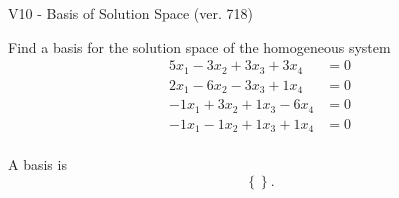 \begin{exercise}
  \begin{exerciseTitle}V10 - Basis of Solution Space (ver. 718)\end{exerciseTitle}
  \begin{exerciseStatement}
    Find a basis for the solution space of the homogeneous system 
\begin{align*}
 5 x_ 1 -3 x_ 2 + 3 x_ 3 + 3 x_ 4 &= 0  \\ 
  2 x_ 1 -6 x_ 2 -3 x_ 3 + 1 x_ 4 &= 0  \\ 
  -1 x_ 1 + 3 x_ 2 + 1 x_ 3 -6 x_ 4 &= 0  \\ 
  -1 x_ 1 -1 x_ 2 + 1 x_ 3 + 1 x_ 4 &= 0  \\ 
 \end{align*}


 
  \end{exerciseStatement}

  \begin{exerciseAnswer}
   A basis is   
\[\left\{\right\}.\]

  


  \end{exerciseAnswer}
\end{exercise}